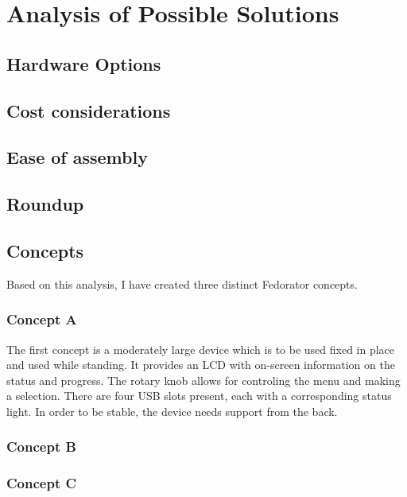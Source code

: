 \chapter{Analysis of Possible Solutions}
    \section{Hardware Options}
        \blind[4]
    \section{Cost considerations}
        \blind[2]
    \section{Ease of assembly}
        \blind[2]
    \section{Roundup}
        \blind[2]
    \section{Concepts}
        Based on this analysis, I have created three distinct Fedorator concepts.
        \subsection{Concept A}
            The first concept is a moderately large device which is to be used fixed in place and used while standing.  It provides an LCD with on-screen information on the status and progress.  The rotary knob allows for controling the menu and making a selection.  There are four USB slots present, each with a corresponding status light.  In order to be stable, the device needs support from the back.
            \blind[1]
        \subsection{Concept B}
            \blind[2]
        \subsection{Concept C}
            \blind[2]
